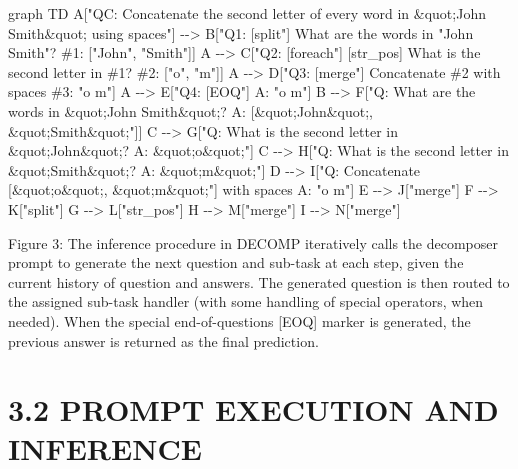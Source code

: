 \documentclass[
]{article}
\newenvironment{Shaded}{}{}
\newcommand{\NormalTok}[1]{#1}
\begin{document}
\begin{Shaded}
\begin{Highlighting}[]
\NormalTok{graph TD}
\NormalTok{    A["QC: Concatenate the second letter of every word in \&quot;John Smith\&quot; using spaces"] {-}{-}\textgreater{} B["Q1: [split"] What are the words in "John Smith"? \#1: ["John", "Smith"]]}
\NormalTok{    A {-}{-}\textgreater{} C["Q2: [foreach"] [str\_pos] What is the second letter in \#1? \#2: ["o", "m"]]}
\NormalTok{    A {-}{-}\textgreater{} D["Q3: [merge"] Concatenate \#2 with spaces \#3: "o m"]}
\NormalTok{    A {-}{-}\textgreater{} E["Q4: [EOQ"] A: "o m"]}
\NormalTok{    B {-}{-}\textgreater{} F["Q: What are the words in \&quot;John Smith\&quot;? A: [\&quot;John\&quot;, \&quot;Smith\&quot;"]]}
\NormalTok{    C {-}{-}\textgreater{} G["Q: What is the second letter in \&quot;John\&quot;? A: \&quot;o\&quot;"]}
\NormalTok{    C {-}{-}\textgreater{} H["Q: What is the second letter in \&quot;Smith\&quot;? A: \&quot;m\&quot;"]}
\NormalTok{    D {-}{-}\textgreater{} I["Q: Concatenate [\&quot;o\&quot;, \&quot;m\&quot;"] with spaces A: "o m"]}
\NormalTok{    E {-}{-}\textgreater{} J["merge"]}
\NormalTok{    F {-}{-}\textgreater{} K["split"]}
\NormalTok{    G {-}{-}\textgreater{} L["str\_pos"]}
\NormalTok{    H {-}{-}\textgreater{} M["merge"]}
\NormalTok{    I {-}{-}\textgreater{} N["merge"]}
\end{Highlighting}
\end{Shaded}

Figure 3: The inference procedure in DECOMP iteratively calls the
decomposer prompt to generate the next question and sub-task at each
step, given the current history of question and answers. The generated
question is then routed to the assigned sub-task handler (with some
handling of special operators, when needed). When the special
end-of-questions {[}EOQ{]} marker is generated, the previous answer is
returned as the final prediction.

\section{3.2 PROMPT EXECUTION AND
INFERENCE}\label{prompt-execution-and-inference}
\end{document}
